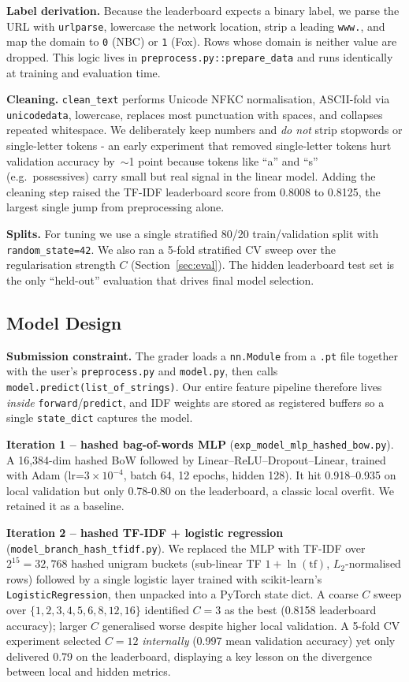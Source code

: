 \documentclass[10pt]{article}
\begin{document}
\textbf{Label derivation.} Because the leaderboard expects a binary label, we parse the URL with \texttt{urlparse}, lowercase the network location, strip a leading \texttt{www.}, and map the domain to \texttt{0} (NBC) or \texttt{1} (Fox). Rows whose domain is neither value are dropped. This logic lives in \texttt{preprocess.py::prepare\_data} and runs identically at training and evaluation time.

\textbf{Cleaning.} \texttt{clean\_text} performs Unicode NFKC normalisation, ASCII-fold via \texttt{unicodedata}, lowercase, replaces most punctuation with spaces, and collapses repeated whitespace. We deliberately keep numbers and \emph{do not} strip stopwords or single-letter tokens - an early experiment that removed single-letter tokens hurt validation accuracy by~$\sim$1 point because tokens like ``a'' and ``s'' (e.g.\ possessives) carry small but real signal in the linear model. Adding the cleaning step raised the TF-IDF leaderboard score from 0.8008 to 0.8125, the largest single jump from preprocessing alone.

\textbf{Splits.} For tuning we use a single stratified 80/20 train/validation split with \texttt{random\_state=42}. We also ran a 5-fold stratified CV sweep over the regularisation strength $C$ (Section~\ref{sec:eval}). The hidden leaderboard test set is the only ``held-out'' evaluation that drives final model selection.

\subsection{Model Design}
\textbf{Submission constraint.} The grader loads a \texttt{nn.Module} from a \texttt{.pt} file together with the user's \texttt{preprocess.py} and \texttt{model.py}, then calls \texttt{model.predict(list\_of\_strings)}. Our entire feature pipeline therefore lives \emph{inside} \texttt{forward}/\texttt{predict}, and IDF weights are stored as registered buffers so a single \texttt{state\_dict} captures the model.

\textbf{Iteration 1 -- hashed bag-of-words MLP} (\texttt{exp\_model\_mlp\_hashed\_bow.py}). A 16{,}384-dim hashed BoW followed by Linear--ReLU--Dropout--Linear, trained with Adam (lr=$3\!\times\!10^{-4}$, batch 64, 12 epochs, hidden 128). It hit 0.918--0.935 on local validation but only 0.78-0.80 on the leaderboard, a classic local overfit. We retained it as a baseline.

\textbf{Iteration 2 -- hashed TF-IDF + logistic regression} (\texttt{model\_branch\_hash\_tfidf.py}). We replaced the MLP with TF-IDF over $2^{15}=32{,}768$ hashed unigram buckets (sub-linear TF $1+\ln(\text{tf})$, $L_2$-normalised rows) followed by a single logistic layer trained with scikit-learn's \texttt{LogisticRegression}, then unpacked into a PyTorch state dict. A coarse $C$ sweep over $\{1,2,3,4,5,6,8,12,16\}$ identified $C=3$ as the best (0.8158 leaderboard accuracy); larger $C$ generalised worse despite higher local validation. A 5-fold CV experiment selected $C=12$ \emph{internally} (0.997 mean validation accuracy) yet only delivered 0.79 on the leaderboard, displaying a key lesson on the divergence between local and hidden metrics.
\end{document}
